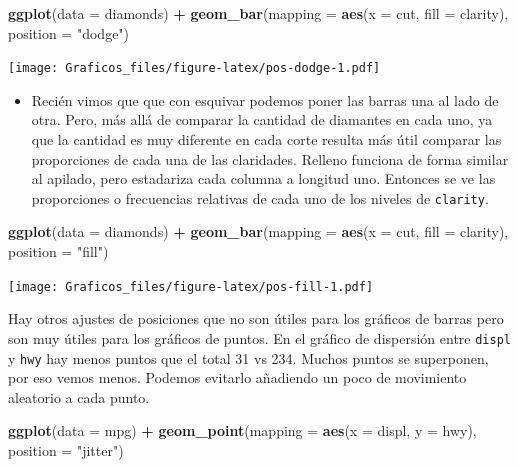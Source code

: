 \documentclass[]{book}
\newenvironment{Shaded}{\begin{snugshade}}{\end{snugshade}}
\newcommand{\DataTypeTok}[1]{\textcolor[rgb]{0.13,0.29,0.53}{#1}}
\newcommand{\KeywordTok}[1]{\textcolor[rgb]{0.13,0.29,0.53}{\textbf{#1}}}
\newcommand{\NormalTok}[1]{#1}
\newcommand{\OperatorTok}[1]{\textcolor[rgb]{0.81,0.36,0.00}{\textbf{#1}}}
\newcommand{\StringTok}[1]{\textcolor[rgb]{0.31,0.60,0.02}{#1}}
\providecommand{\tightlist}{%
  \setlength{\itemsep}{0pt}\setlength{\parskip}{0pt}}
\theoremstyle{definition}
\theoremstyle{definition}
\theoremstyle{definition}
\theoremstyle{remark}
\begin{document}
\begin{Shaded}
\begin{Highlighting}[]
\KeywordTok{ggplot}\NormalTok{(}\DataTypeTok{data =}\NormalTok{ diamonds) }\OperatorTok{+}\StringTok{ }
\StringTok{   }\KeywordTok{geom_bar}\NormalTok{(}\DataTypeTok{mapping =} \KeywordTok{aes}\NormalTok{(}\DataTypeTok{x =}\NormalTok{ cut, }\DataTypeTok{fill =}\NormalTok{ clarity), }\DataTypeTok{position =} \StringTok{"dodge"}\NormalTok{)}
\end{Highlighting}
\end{Shaded}

\texttt{[image: Graficos\_files/figure-latex/pos-dodge-1.pdf]}

\begin{itemize}
\tightlist
\item
  Recién vimos que que con esquivar podemos poner las barras una al lado
  de otra. Pero, más allá de comparar la cantidad de diamantes en cada
  uno, ya que la cantidad es muy diferente en cada corte resulta más
  útil comparar las proporciones de cada una de las claridades. Relleno
  funciona de forma similar al apilado, pero estadariza cada columna a
  longitud uno. Entonces se ve las proporciones o frecuencias relativas
  de cada uno de los niveles de \texttt{clarity}.
\end{itemize}

\begin{Shaded}
\begin{Highlighting}[]
\KeywordTok{ggplot}\NormalTok{(}\DataTypeTok{data =}\NormalTok{ diamonds) }\OperatorTok{+}\StringTok{ }
\StringTok{   }\KeywordTok{geom_bar}\NormalTok{(}\DataTypeTok{mapping =} \KeywordTok{aes}\NormalTok{(}\DataTypeTok{x =}\NormalTok{ cut, }\DataTypeTok{fill =}\NormalTok{ clarity), }\DataTypeTok{position =} \StringTok{"fill"}\NormalTok{)}
\end{Highlighting}
\end{Shaded}

\texttt{[image: Graficos\_files/figure-latex/pos-fill-1.pdf]}

Hay otros ajustes de posiciones que no son útiles para los gráficos de
barras pero son muy útiles para los gráficos de puntos. En el gráfico de
dispersión entre \texttt{displ} y \texttt{hwy} hay menos puntos que el
total 31 vs 234. Muchos puntos se superponen, por eso vemos menos.
Podemos evitarlo añadiendo un poco de movimiento aleatorio a cada punto.

\begin{Shaded}
\begin{Highlighting}[]
\KeywordTok{ggplot}\NormalTok{(}\DataTypeTok{data =}\NormalTok{ mpg) }\OperatorTok{+}
\StringTok{  }\KeywordTok{geom_point}\NormalTok{(}\DataTypeTok{mapping =} \KeywordTok{aes}\NormalTok{(}\DataTypeTok{x =}\NormalTok{ displ, }\DataTypeTok{y =}\NormalTok{ hwy), }\DataTypeTok{position =} \StringTok{"jitter"}\NormalTok{)}
\end{Highlighting}
\end{Shaded}
\end{document}

